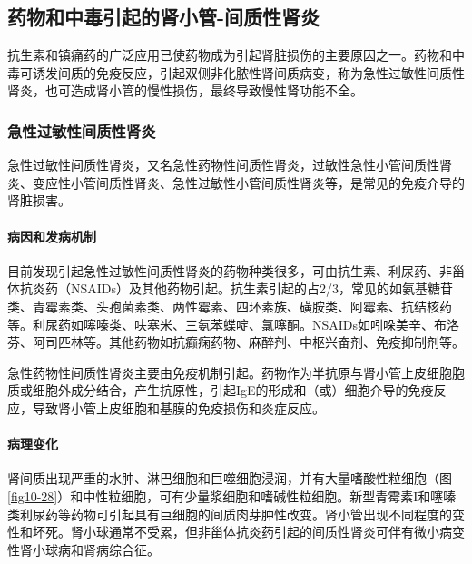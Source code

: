 \subsection{药物和中毒引起的肾小管-间质性肾炎}

抗生素和镇痛药的广泛应用已使药物成为引起肾脏损伤的主要原因之一。药物和中毒可诱发间质的免疫反应，引起双侧非化脓性肾间质病变，称为急性过敏性间质性肾炎，也可造成肾小管的慢性损伤，最终导致慢性肾功能不全。

\subsubsection{急性过敏性间质性肾炎}

急性过敏性间质性肾炎，又名急性药物性间质性肾炎，过敏性急性小管间质性肾炎、变应性小管间质性肾炎、急性过敏性小管间质性肾炎等，是常见的免疫介导的肾脏损害。

\paragraph{病因和发病机制}
目前发现引起急性过敏性间质性肾炎的药物种类很多，可由抗生素、利尿药、非甾体抗炎药（NSAIDs）及其他药物引起。抗生素引起的占2/3，常见的如氨基糖苷类、青霉素类、头孢菌素类、两性霉素、四环素族、磺胺类、阿霉素、抗结核药等。利尿药如噻嗪类、呋塞米、三氨苯蝶啶、氯噻酮。NSAIDs如吲哚美辛、布洛芬、阿司匹林等。其他药物如抗癫痫药物、麻醉剂、中枢兴奋剂、免疫抑制剂等。

急性药物性间质性肾炎主要由免疫机制引起。药物作为半抗原与肾小管上皮细胞胞质或细胞外成分结合，产生抗原性，引起IgE的形成和（或）细胞介导的免疫反应，导致肾小管上皮细胞和基膜的免疫损伤和炎症反应。

\paragraph{病理变化}
肾间质出现严重的水肿、淋巴细胞和巨噬细胞浸润，并有大量嗜酸性粒细胞（图\ref{fig10-28}）和中性粒细胞，可有少量浆细胞和嗜碱性粒细胞。新型青霉素I和噻嗪类利尿药等药物可引起具有巨细胞的间质肉芽肿性改变。肾小管出现不同程度的变性和坏死。肾小球通常不受累，但非甾体抗炎药引起的间质性肾炎可伴有微小病变性肾小球病和肾病综合征。

